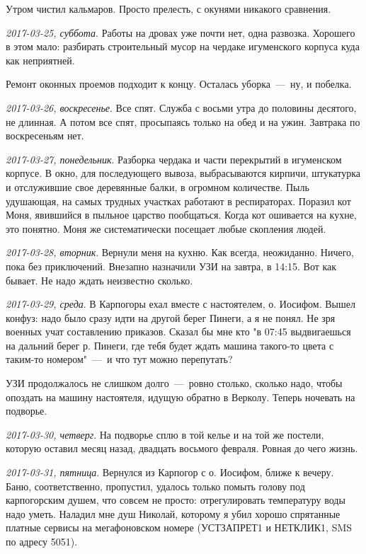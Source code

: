 \documentclass[
    12pt
    ,a4paper
    ,oneside
    ,russian
]{memoir}
\newcommand{\mydatestamp}{
    \bigskip   %
    \emph
}
\newcommand{\mds}{\mydatestamp}
\begin{document}
    Утром чистил кальмаров. Просто прелесть, с окунями никакого сравнения.
    
    \mds{2017-03-25, суббота}. Работы на дровах уже почти нет, одна развозка. Хорошего в этом мало: разбирать строительный мусор на чердаке игуменского корпуса куда как неприятней.
    
    Ремонт оконных проемов подходит к концу. Осталась уборка~---~ну, и побелка.
    
    \mds{2017-03-26, воскресенье}. Все спят. Служба с восьми утра до половины десятого, не длинная. А потом все спят, просыпаясь только на обед и на ужин. Завтрака по воскресеньям нет.
    
    \mds{2017-03-27, понедельник}. Разборка чердака и части перекрытий в игуменском корпусе. В окно, для последующего вывоза, выбрасываются кирпичи, штукатурка и отслужившие свое деревянные балки, в огромном количестве. Пыль удушающая, на самых трудных участках работают в респираторах. Поразил кот Моня, явившийся в пыльное царство пообщаться. Когда кот ошивается на кухне, это понятно. Моня же систематически посещает любые скопления людей.
    
    \mds{2017-03-28, вторник}. Вернули меня на кухню. Как всегда, неожиданно. Ничего, пока без приключений. Внезапно назначили УЗИ на завтра, в 14:15. Вот как бывает. Не надо ждать неизвестно сколько.
    
    \mds{2017-03-29, среда}. В Карпогоры ехал вместе с настоятелем, о. Иосифом. Вышел конфуз: надо было сразу идти на другой берег Пинеги, а я не понял. Не зря военных учат составлению приказов. Сказал бы мне кто "в 07:45 выдвигаешься на дальний берег р. Пинеги, где тебя будет ждать машина такого-то цвета с таким-то номером"~---~и что тут можно перепутать?
    
    УЗИ продолжалось не слишком долго~---~ровно столько, сколько надо, чтобы опоздать на машину настоятеля, идущую обратно в Верколу. Теперь ночевать на подворье.

    \mds{2017-03-30, четверг}. На подворье сплю в той келье и на той же постели, которую оставил месяц назад, двадцать восьмого февраля. Ровная до чего жизнь.

    \mds{2017-03-31, пятница}. Вернулся из Карпогор с о. Иосифом, ближе к вечеру. Баню, соответственно, пропустил, удалось только помыть голову под карпогорским душем, что совсем не просто: отрегулировать температуру воды надо уметь. Наладил мне душ Николай, которому я убил хорошо спрятанные платные сервисы на мегафоновском номере (УСТЗАПРЕТ1 и НЕТКЛИК1, SMS по адресу 5051).
    
\end{document}

